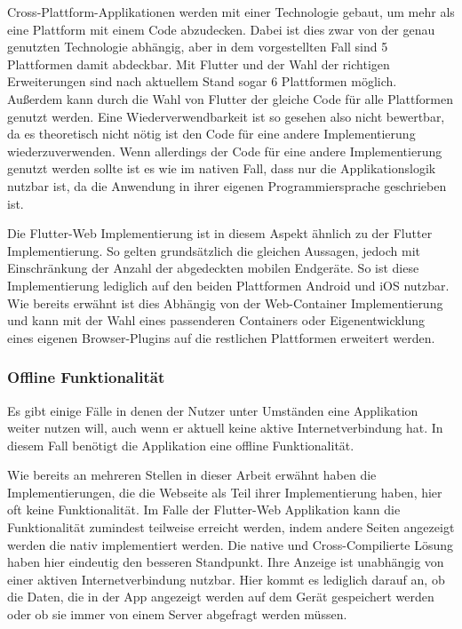 Cross-Plattform-Applikationen werden mit einer Technologie gebaut, um mehr als eine Plattform mit einem Code abzudecken. Dabei ist dies zwar von der genau genutzten Technologie abhängig, aber in dem vorgestellten Fall sind 5 Plattformen damit abdeckbar. Mit Flutter und der Wahl der richtigen Erweiterungen sind nach aktuellem Stand sogar 6 Plattformen möglich. Außerdem kann durch die Wahl von Flutter der gleiche Code für alle Plattformen genutzt werden. Eine Wiederverwendbarkeit ist so gesehen also nicht bewertbar, da es theoretisch nicht nötig ist den Code für eine andere Implementierung wiederzuverwenden. Wenn allerdings der Code für eine andere Implementierung genutzt werden sollte ist es wie im nativen Fall, dass nur die Applikationslogik nutzbar ist, da die Anwendung in ihrer eigenen Programmiersprache geschrieben ist.

Die Flutter-Web Implementierung ist in diesem Aspekt ähnlich zu der Flutter Implementierung. So gelten grundsätzlich die gleichen Aussagen, jedoch mit Einschränkung der Anzahl der abgedeckten mobilen Endgeräte. So ist diese Implementierung lediglich auf den beiden Plattformen Android und iOS nutzbar. Wie bereits erwähnt ist dies Abhängig von der Web-Container Implementierung und kann mit der Wahl eines passenderen Containers oder Eigenentwicklung eines eigenen Browser-Plugins auf die restlichen Plattformen erweitert werden.

\subsubsection{Offline Funktionalität}
Es gibt einige Fälle in denen der Nutzer unter Umständen eine Applikation weiter nutzen will, auch wenn er aktuell keine aktive Internetverbindung hat. In diesem Fall benötigt die Applikation eine offline Funktionalität.

Wie bereits an mehreren Stellen in dieser Arbeit erwähnt haben die Implementierungen, die die Webseite als Teil ihrer Implementierung haben, hier oft keine Funktionalität. Im Falle der Flutter-Web Applikation kann die Funktionalität zumindest teilweise erreicht werden, indem andere Seiten angezeigt werden die nativ implementiert werden. Die native und Cross-Compilierte Lösung haben hier eindeutig den besseren Standpunkt. Ihre Anzeige ist unabhängig von einer aktiven Internetverbindung nutzbar. Hier kommt es lediglich darauf an, ob die Daten, die in der App angezeigt werden auf dem Gerät gespeichert werden oder ob sie immer von einem Server abgefragt werden müssen. 

